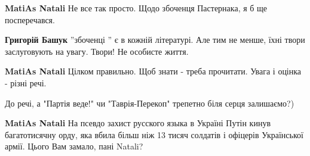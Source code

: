 \begin{itemize}
 
\textbf{MatiAs Natali} Не все так просто. Щодо збоченця Пастернака, я б ще
посперечався.

\begin{itemize}
 
\textbf{Григорій Башук} ''збоченці '' є в кожній літературі. Але тим не менше, їхні твори заслуговують на увагу. Твори! Не особисте життя.

 
\textbf{MatiAs Natali} Цілком правильно. Щоб знати - треба прочитати. Увага і оцінка - різні речі.
\end{itemize}

 
До речі, а "Партія веде!" чи "Таврія-Перекоп" трепетно біля серця залишаємо?)

 
\textbf{MatiAs Natali} На псевдо захист русского языка в Україні Путін кинув багатотисячну орду, яка вбила більш ніж 13 тисяч солдатів і офіцерів Української армії. Цього Вам замало, пані Natali?

 

\end{itemize}
